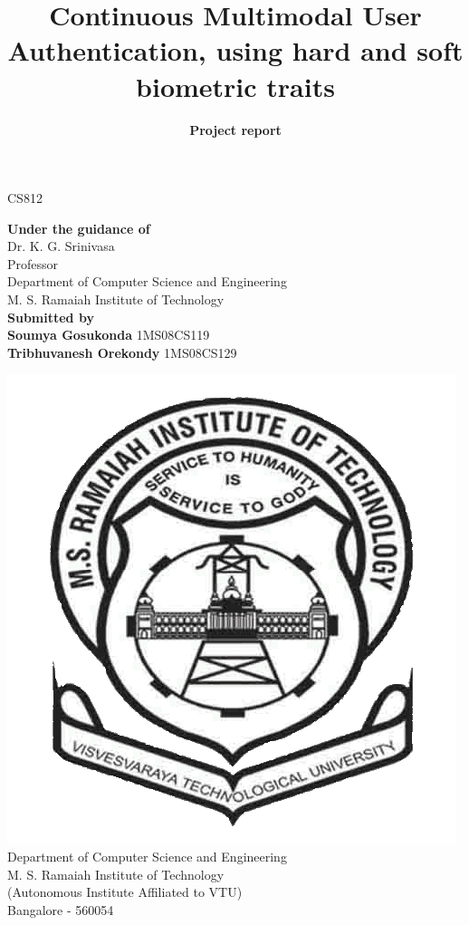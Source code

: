 \documentclass[12pt]{article}			%
\title{Continuous Multimodal User Authentication, using hard and soft biometric traits}	%
\author{{\bf Project report}{\bf}}
\date{}				%
\begin{document}

\maketitle				%
\thispagestyle{empty}			%

\begin{center}

{\Large CS812}\\[3ex]
{\Large}

{\large}
{\bf Under the guidance of }{\bf}\\[2ex]
Dr. K. G. Srinivasa\\
Professor\\
Department of Computer Science and Engineering\\
M. S. Ramaiah Institute of Technology\\[3ex]


{\bf Submitted by}{\bf}\\[2ex]
{\bf Soumya Gosukonda }{\bf} 1MS08CS119\\
{\bf Tribhuvanesh Orekondy }{\bf} 1MS08CS129\\[8ex]
{\large}

\includegraphics[scale=0.20]{msrit.png}\\
Department of Computer Science and Engineering\\
M. S. Ramaiah Institute of Technology\\
(Autonomous Institute Affiliated to VTU)\\
Bangalore - 560054
\end{center}
\end{document}
